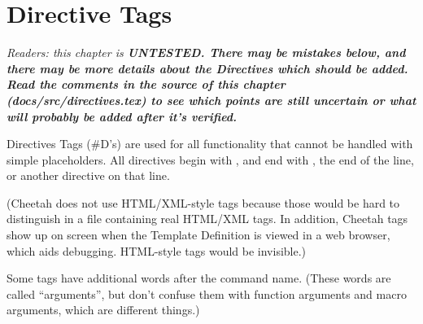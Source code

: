 \section{Directive Tags}

\em{Readers: this chapter is \bf{UNTESTED}.  There may be mistakes below, and
there may be more details about the Directives which should be added.  Read the
comments in the source of this chapter (docs/src/directives.tex) to see which
points are still uncertain or what will probably be added after it's verified.}


Directives Tags (#D's) are used for all functionality that cannot be handled
with simple placeholders.  All directives begin with \code{\#}, and end with
\code{/\#}, the end of the line, or another directive on that line.  

(Cheetah does not use HTML/XML-style tags because those would be hard to 
distinguish in a file containing real HTML/XML tags.  In addition, Cheetah tags
show up on screen when the Template Definition is viewed in a web browser,
which aids debugging.  HTML-style tags would be invisible.)

Some tags have additional words after the
command name.  (These words are called ``arguments'', but don't confuse them
with function arguments and macro arguments, which are different things.)



